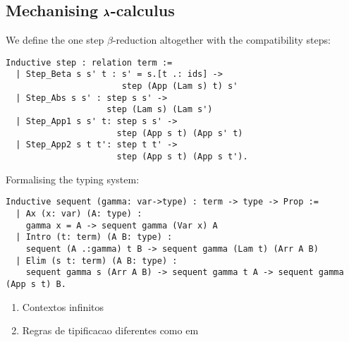 \subsection{Mechanising $\pmb{\lambda}$-calculus}

We define the one step $\beta$-reduction altogether with the compatibility steps:
\begin{lstlisting}[language=Coq]
  Inductive step : relation term :=
  | Step_Beta s s' t : s' = s.[t .: ids] ->
                       step (App (Lam s) t) s'
  | Step_Abs s s' : step s s' ->
                    step (Lam s) (Lam s')
  | Step_App1 s s' t: step s s' ->
                      step (App s t) (App s' t)
  | Step_App2 s t t': step t t' ->
                      step (App s t) (App s t').
\end{lstlisting}

Formalising the typing system:

\begin{lstlisting}[language=Coq]
  Inductive sequent (gamma: var->type) : term -> type -> Prop := 
  | Ax (x: var) (A: type) :
    gamma x = A -> sequent gamma (Var x) A
  | Intro (t: term) (A B: type) :
    sequent (A .:gamma) t B -> sequent gamma (Lam t) (Arr A B)
  | Elim (s t: term) (A B: type) :
    sequent gamma s (Arr A B) -> sequent gamma t A -> sequent gamma (App s t) B.
\end{lstlisting}

\begin{enumerate}
\item Contextos infinitos
\item Regras de tipificacao diferentes como em \cite{AutosubstManual}
\end{enumerate}

